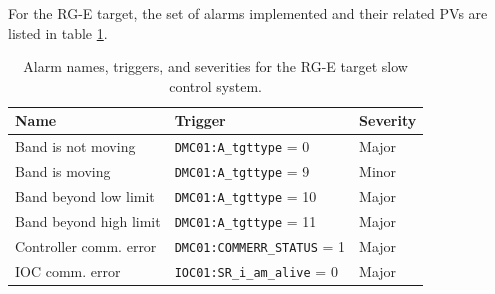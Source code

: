         For the RG-E target, the set of alarms implemented and their related PVs are listed in table \ref{tab::alarmspv}.
        
        \begin{table}[b!]
            \caption{Alarm names, triggers, and severities for the RG-E target slow control system.}

            \begin{center}
                \begin{tabularx}{360pt}{llX}
                    \hline
                    \textbf{Name}          & \textbf{Trigger}                     & \textbf{Severity} \\
                    \hline
                    Band is not moving     & \texttt{DMC01:A\_tgttype}       =  0 & Major             \\
                    Band is moving         & \texttt{DMC01:A\_tgttype}       =  9 & Minor             \\
                    Band beyond low limit  & \texttt{DMC01:A\_tgttype}       = 10 & Major             \\
                    Band beyond high limit & \texttt{DMC01:A\_tgttype}       = 11 & Major             \\
                    Controller comm. error & \texttt{DMC01:COMMERR\_STATUS}  =  1 & Major             \\
                    IOC comm. error        & \texttt{IOC01:SR\_i\_am\_alive} =  0 & Major             \\
                    \hline
                \end{tabularx}
                \label{tab::alarmspv}
            \end{center}
        \end{table}
